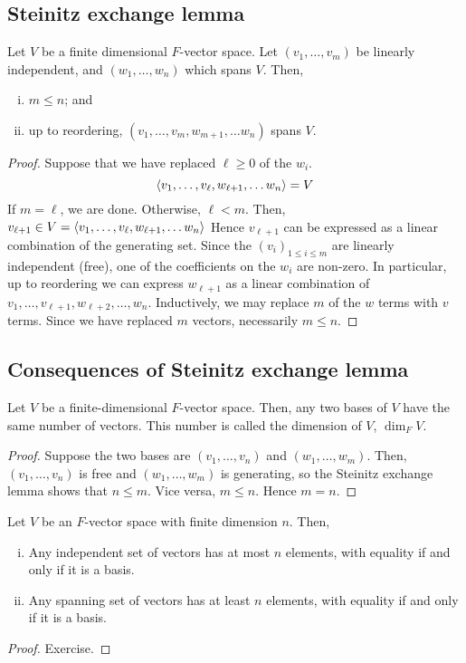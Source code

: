 \subsection{Steinitz exchange lemma}
\begin{theorem}
	Let \( V \) be a finite dimensional \( F \)-vector space.
	Let \( (v_1, \dots, v_m) \) be linearly independent, and \( (w_1, \dots, w_n) \) which spans \( V \).
	Then,
	\begin{enumerate}[(i)]
		\item \( m \leq n \); and
		\item up to reordering, \( (v_1, \dots, v_m, w_{m+1}, \dots w_n) \) spans \( V \).
	\end{enumerate}
\end{theorem}
\begin{proof}
	Suppose that we have replaced \( \ell \geq 0 \) of the \( w_i \).
	\[
		\langle{} v_1, \dots, v_\ell, w_{\ell+1}, \dots w_n \rangle = V
	\]
	If \( m = \ell \), we are done.
	Otherwise, \( \ell < m \).
	Then,
	\( v_{\ell + 1} \in V = \langle{} v_1, \dots, v_\ell, w_{\ell+1}, \dots w_n \rangle \)
	Hence \( v_{\ell + 1} \) can be expressed as a linear combination of the generating set.
	Since the \( (v_i)_{1 \leq i \leq m} \) are linearly independent (free), one of the coefficients on the \( w_i \) are non-zero.
	In particular, up to reordering we can express \( w_{\ell+1} \) as a linear combination of \( v_1, \dots, v_{\ell + 1}, w_{\ell + 2}, \dots, w_n \).
	Inductively, we may replace \( m \) of the \( w \) terms with \( v \) terms.
	Since we have replaced \( m \) vectors, necessarily \( m \leq n \).
\end{proof}

\subsection{Consequences of Steinitz exchange lemma}
\begin{corollary}
	Let \( V \) be a finite-dimensional \( F \)-vector space.
	Then, any two bases of \( V \) have the same number of vectors.
	This number is called the dimension of \( V \), \( \dim_F V \).
\end{corollary}
\begin{proof}
	Suppose the two bases are \( (v_1, \dots, v_n) \) and \( (w_1, \dots, w_m) \).
	Then, \( (v_1, \dots, v_n) \) is free and \( (w_1, \dots, w_m) \) is generating, so the Steinitz exchange lemma shows that \( n \leq m \).
	Vice versa, \( m \leq n \).
	Hence \( m = n \).
\end{proof}
\begin{corollary}
	Let \( V \) be an \( F \)-vector space with finite dimension \( n \).
	Then,
	\begin{enumerate}[(i)]
		\item Any independent set of vectors has at most \( n \) elements, with equality if and only if it is a basis.
		\item Any spanning set of vectors has at least \( n \) elements, with equality if and only if it is a basis.
	\end{enumerate}
\end{corollary}
\begin{proof}
	Exercise.
\end{proof}

